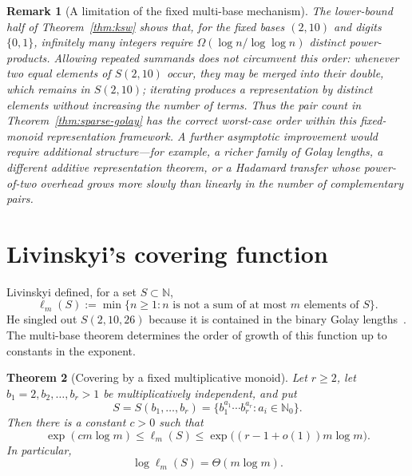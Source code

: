 \documentclass[11pt]{article}
\newtheorem{theorem}{Theorem}[section]
\newtheorem{remark}[theorem]{Remark}
\newcommand{\N}{\mathbb{N}}
\begin{document}
\begin{remark}[A limitation of the fixed multi-base mechanism]\label{rem:optimality}
The lower-bound half of Theorem~\ref{thm:ksw} shows that, for the fixed bases $(2,10)$ and digits $\{0,1\}$, infinitely many integers require
$\Omega(\log n/\log\log n)$ distinct power-products.  Allowing repeated summands does not circumvent this order: whenever two equal elements of $S(2,10)$ occur, they may be merged into their double, which remains in $S(2,10)$; iterating produces a representation by distinct elements without increasing the number of terms.  Thus the pair count in Theorem~\ref{thm:sparse-golay} has the correct worst-case order within this fixed-monoid representation framework.  A further asymptotic improvement would require additional structure---for example, a richer family of Golay lengths, a different additive representation theorem, or a Hadamard transfer whose power-of-two overhead grows more slowly than linearly in the number of complementary pairs.
\end{remark}

\section{Livinskyi's covering function}\label{sec:covering}
Livinskyi defined, for a set $S\subset\N$,
\begin{equation}\label{eq:ell-def}
\ell_m(S):=\min\{n\ge1:n\text{ is not a sum of at most }m\text{ elements of }S\}.
\end{equation}
He singled out $S(2,10,26)$ because it is contained in the binary Golay lengths~\cite{Livinskyi2012}.  The multi-base theorem determines the order of growth of this function up to constants in the exponent.

\begin{theorem}[Covering by a fixed multiplicative monoid]\label{thm:ell-general}
Let $r\ge2$, let $b_1=2,b_2,\ldots,b_r>1$ be multiplicatively independent, and put
\[
S=S(b_1,\ldots,b_r)=\{b_1^{a_1}\cdots b_r^{a_r}:a_i\in\N_0\}.
\]
Then there is a constant $c>0$ such that
\begin{equation}\label{eq:ell-bounds}
\exp(c m\log m)
\le \ell_m(S)
\le \exp\bigl((r-1+o(1))m\log m\bigr).
\end{equation}
In particular,
\[
\log\ell_m(S)=\Theta(m\log m).
\]
\end{theorem}
\end{document}
